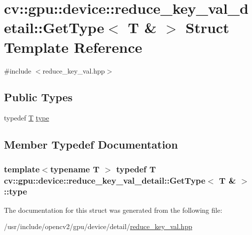 \hypertarget{structcv_1_1gpu_1_1device_1_1reduce__key__val__detail_1_1GetType_3_01T_01_6_01_4}{\section{cv\-:\-:gpu\-:\-:device\-:\-:reduce\-\_\-key\-\_\-val\-\_\-detail\-:\-:Get\-Type$<$ T \& $>$ Struct Template Reference}
\label{structcv_1_1gpu_1_1device_1_1reduce__key__val__detail_1_1GetType_3_01T_01_6_01_4}
}


{\ttfamily \#include $<$reduce\-\_\-key\-\_\-val.\-hpp$>$}

\subsection*{Public Types}
\begin{DoxyCompactItemize}
\item 
typedef \hyperlink{calib3d_8hpp_a3efb9551a871ddd0463079a808916717}{T} \hyperlink{structcv_1_1gpu_1_1device_1_1reduce__key__val__detail_1_1GetType_3_01T_01_6_01_4_ab7b67b95e267349d9ae327e4fe0fc8aa}{type}
\end{DoxyCompactItemize}


\subsection{Member Typedef Documentation}
\hypertarget{structcv_1_1gpu_1_1device_1_1reduce__key__val__detail_1_1GetType_3_01T_01_6_01_4_ab7b67b95e267349d9ae327e4fe0fc8aa}{
\subsubsection[{type}]{\setlength{\rightskip}{0pt plus 5cm}template$<$typename T $>$ typedef {\bf T} {\bf cv\-::gpu\-::device\-::reduce\-\_\-key\-\_\-val\-\_\-detail\-::\-Get\-Type}$<$ {\bf T} \& $>$\-::{\bf type}}}\label{structcv_1_1gpu_1_1device_1_1reduce__key__val__detail_1_1GetType_3_01T_01_6_01_4_ab7b67b95e267349d9ae327e4fe0fc8aa}


The documentation for this struct was generated from the following file\-:\begin{DoxyCompactItemize}
\item 
/usr/include/opencv2/gpu/device/detail/\hyperlink{reduce__key__val_8hpp}{reduce\-\_\-key\-\_\-val.\-hpp}\end{DoxyCompactItemize}
